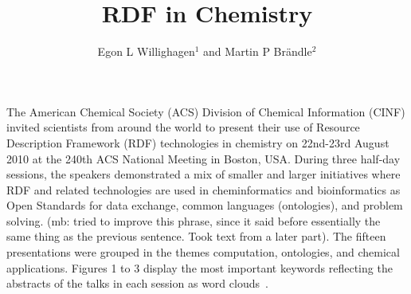 \documentclass[10pt]{bmc_article}
\newenvironment{bmcformat}{\begin{raggedright}\baselineskip20pt\sloppy\setboolean{publ}{false}}{\end{raggedright}\baselineskip20pt\sloppy}
\begin{document}
\begin{bmcformat}

\title{RDF in Chemistry}
 
\author{Egon L Willighagen\correspondingauthor$^{1}$%
       and 
         Martin P Br\"andle$^2$%
      }

\address{%
    \iid(1)Division of Molecular Toxicology, Institute of Environmental Medicine, Karolinska Institutet, SE-17177 Stockholm, Sweden\\
    \iid(2)Chemistry Biology Pharmacy Information Center, ETH Z\"urich, Z\"urich, Switzerland
}%

\maketitle



The American Chemical Society (ACS) Division of Chemical Information (CINF)
invited scientists from around the world to present their use of Resource
Description Framework (RDF) technologies in chemistry on 22nd-23rd August 2010
at the 240th ACS National Meeting in Boston, USA. During three half-day
sessions, the speakers demonstrated a mix of smaller and larger initiatives
where RDF and related technologies are used in cheminformatics and
bioinformatics as Open Standards for data exchange, common languages
(ontologies), and problem solving. (mb: tried to improve this phrase, since it
said before essentially the same thing as the previous sentence. Took text from
a later part). The fifteen presentations were grouped in the themes computation,
ontologies, and chemical applications. Figures 1 to 3 display the most important
keywords reflecting the abstracts of the talks in each session as word
clouds~\cite{WORDLE}.


\end{bmcformat}
\end{document}
